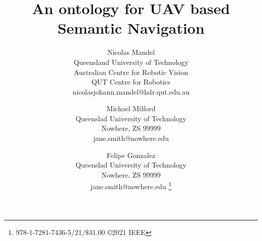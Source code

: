 \documentclass[twocolumn,letterpaper]{IEEEAerospaceCLS}  %
\begin{document}
\title{An ontology for UAV based  Semantic Navigation}

\author{%
Nicolas Mandel\\ 
Queensland University of Technology\\
Australian Centre for Robotic Vision\\
QUT Centre for Robotics\\
nicolasjohann.mandel@hdr.qut.edu.au
\and 
Michael Milford\\
Queenslad University of Technology\\
Nowhere, ZS 99999\\
jane.smith@nowhere.edu
\and
Felipe Gonzalez\\
Queenslad University of Technology\\
Nowhere, ZS 99999\\
jane.smith@nowhere.edu
\thanks{\footnotesize 978-1-7281-7436-5/21/$\$31.00$ \copyright2021 IEEE}              %
}



\maketitle

\thispagestyle{plain}
\pagestyle{plain}



\maketitle

\thispagestyle{plain}
\pagestyle{plain}
\end{document}
